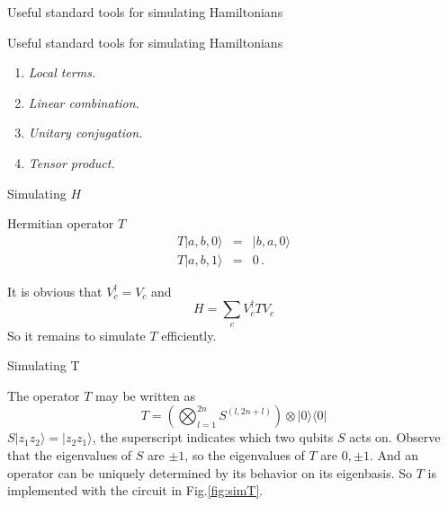 \documentclass{beamer}
\newcommand{\<}{\langle}
\renewcommand{\>}{\rangle}
\newcommand{\be}{\begin{equation}}
\newcommand{\ee}{\end{equation}}
\newcommand{\bea}{\begin{eqnarray}}
\newcommand{\eea}{\end{eqnarray}}
\begin{document}


\begin{frame}{Useful standard tools for simulating Hamiltonians}
    
\begin{block}{Useful standard tools for simulating Hamiltonians}

\begin{enumerate}
    \item {\em Local terms.}
    \item {\em Linear combination.}
    \item {\em Unitary conjugation.} 
    \item {\em Tensor product.}  
\end{enumerate}    

\end{block}
    
\end{frame}


\begin{frame}{Simulating $H$}

\begin{block}{Hermitian operator $T$ }
\bea
  T |a, b, 0\> &=& |b, a, 0\> \\
  T |a, b, 1\> &=& 0
\,.
\eea
\end{block}
It is obvious that $V_c^\dag = V_c$ and
\be
  H = \sum_c V_c^\dag T V_c
\label{eq:simham}
\ee
So it remains to simulate $T$ efficiently.

\end{frame}

\begin{frame}{Simulating T}

The operator $T$ may be written as
\be
  T = \left( \bigotimes_{l=1}^{2n} S^{(l,2n+l)} \right) \otimes |0\>\<0|
\label{eq:swap}
\ee
$S |z_1 z_2\> = |z_2 z_1\>$, the superscript indicates which two qubits $S$ acts on.
\newline \newline
Observe that the eigenvalues of $S$ are $\pm1$, so the eigenvalues of $T$ are $0, \pm1$.
And an operator can be uniquely determined by its behavior on its eigenbasis. So $T$ is implemented with the circuit in Fig.\ref{fig:simT}.

\end{frame}
\end{document}
